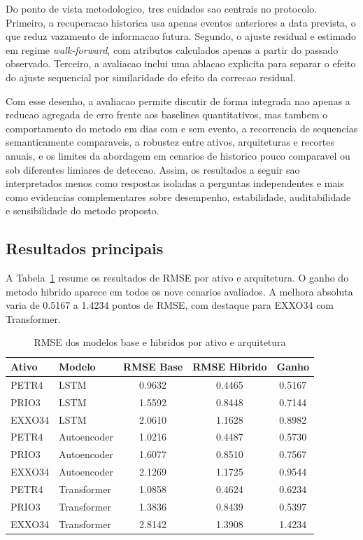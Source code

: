 \documentclass[12pt]{article}
\begin{document}
Do ponto de vista metodologico, tres cuidados sao centrais no protocolo. Primeiro, a recuperacao historica usa apenas eventos anteriores a data prevista, o que reduz vazamento de informacao futura. Segundo, o ajuste residual e estimado em regime \textit{walk-forward}, com atributos calculados apenas a partir do passado observado. Terceiro, a avaliacao inclui uma ablacao explicita para separar o efeito do ajuste sequencial por similaridade do efeito da correcao residual.

Com esse desenho, a avaliacao permite discutir de forma integrada nao apenas a reducao agregada de erro frente aos baselines quantitativos, mas tambem o comportamento do metodo em dias com e sem evento, a recorrencia de sequencias semanticamente comparaveis, a robustez entre ativos, arquiteturas e recortes anuais, e os limites da abordagem em cenarios de historico pouco comparavel ou sob diferentes limiares de deteccao. Assim, os resultados a seguir sao interpretados menos como respostas isoladas a perguntas independentes e mais como evidencias complementares sobre desempenho, estabilidade, auditabilidade e sensibilidade do metodo proposto.

\subsection{Resultados principais}

A Tabela~\ref{tab:rmse_principal} resume os resultados de RMSE por ativo e arquitetura. O ganho do metodo hibrido aparece em todos os nove cenarios avaliados. A melhora absoluta varia de 0.5167 a 1.4234 pontos de RMSE, com destaque para EXXO34 com Transformer.

\begin{table}[H]
\centering
\small
\caption{RMSE dos modelos base e hibridos por ativo e arquitetura}
\label{tab:rmse_principal}
\begin{tabular}{l l c c c}
\toprule
\textbf{Ativo} & \textbf{Modelo} & \textbf{RMSE Base} & \textbf{RMSE Hibrido} & \textbf{Ganho} \\
\midrule
PETR4  & LSTM         & 0.9632 & 0.4465 & 0.5167 \\
PRIO3  & LSTM         & 1.5592 & 0.8448 & 0.7144 \\
EXXO34 & LSTM         & 2.0610 & 1.1628 & 0.8982 \\
PETR4  & Autoencoder  & 1.0216 & 0.4487 & 0.5730 \\
PRIO3  & Autoencoder  & 1.6077 & 0.8510 & 0.7567 \\
EXXO34 & Autoencoder  & 2.1269 & 1.1725 & 0.9544 \\
PETR4  & Transformer  & 1.0858 & 0.4624 & 0.6234 \\
PRIO3  & Transformer  & 1.3836 & 0.8439 & 0.5397 \\
EXXO34 & Transformer  & 2.8142 & 1.3908 & 1.4234 \\
\bottomrule
\end{tabular}
\end{table}
\end{document}
